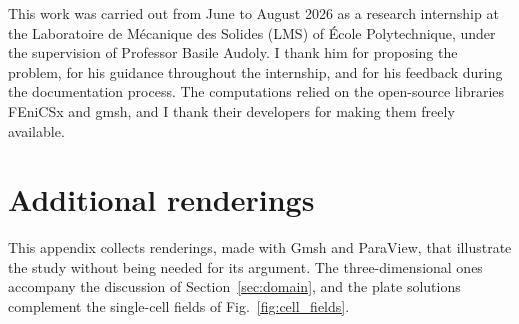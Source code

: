 \documentclass{article}
\begin{document}
This work was carried out from June to August 2026 as a research internship at the
Laboratoire de Mécanique des Solides (LMS) of École Polytechnique, under the supervision
of Professor Basile Audoly. I thank him for proposing the problem, for his guidance throughout the
internship, and for his feedback during the documentation process. The computations relied
on the open-source libraries FEniCSx and gmsh, and I thank their developers for making
them freely available.

\clearpage
\appendix
\section{Additional renderings}

This appendix collects renderings, made with Gmsh and ParaView, that illustrate the
study without being needed for its argument. The three-dimensional ones accompany the
discussion of Section~\ref{sec:domain}, and the plate solutions complement the single-cell
fields of Fig.~\ref{fig:cell_fields}.
\end{document}
